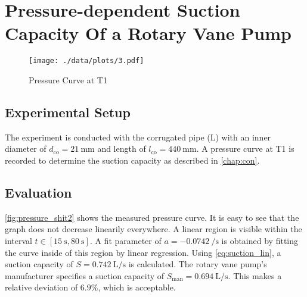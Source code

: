 \chapter{Pressure-dependent Suction Capacity Of a Rotary Vane Pump}\label{chap:3}
\begin{figure}[hbp]
	\centering
	\texttt{[image: ./data/plots/3.pdf]}
	\caption[Pressure Over Time]{Pressure Curve at T1}
	\label{fig:pressure_shit2}
\end{figure}

\section{Experimental Setup}
The experiment is conducted with the corrugated pipe (L) with an inner diameter of $d_\text{co}=\SI{21}{\milli\meter}$ and length of $l_\text{co}=\SI{440}{\milli\meter}$.
A pressure curve at T1 is recorded to determine the suction capacity as described in \autoref{chap:con}.

\section{Evaluation}
\autoref{fig:pressure_shit2} shows the measured pressure curve.
It is easy to see that the graph does not decrease linearily everywhere. A linear region is visible within the interval $t\in[\SI{15}{\second},\SI{80}{\second}]$.
A fit parameter of $a=\SI{-0.0742}{\per\second}$ is obtained by fitting the curve inside of this region by linear regression.
Using \autoref{eq:suction_lin}, a suction capacity of $S=\SI{0.742}{\liter\per\second}$ is calculated.
The rotary vane pump's manufacturer specifies a suction capacity of $S_\text{man}=\SI{0.694}{\liter\per\second}$.
This makes a relative deviation of $\num{6.9}\%$, which is acceptable.
